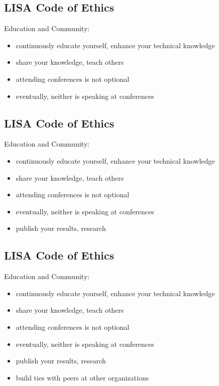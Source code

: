 \documentclass[xga]{xdvislides}
\begin{document}
\subsection{LISA Code of Ethics}
Education and Community:
\begin{itemize}
	\item continuously educate yourself, enhance your technical knowledge
	\item share your knowledge, teach others
	\item attending conferences is not optional
	\item eventually, neither is speaking at conferences
\end{itemize}

\subsection{LISA Code of Ethics}
Education and Community:
\begin{itemize}
	\item continuously educate yourself, enhance your technical knowledge
	\item share your knowledge, teach others
	\item attending conferences is not optional
	\item eventually, neither is speaking at conferences
	\item publish your results, research
\end{itemize}

\subsection{LISA Code of Ethics}
Education and Community:
\begin{itemize}
	\item continuously educate yourself, enhance your technical knowledge
	\item share your knowledge, teach others
	\item attending conferences is not optional
	\item eventually, neither is speaking at conferences
	\item publish your results, research
	\item build ties with peers at other organizations
\end{itemize}
\end{document}
